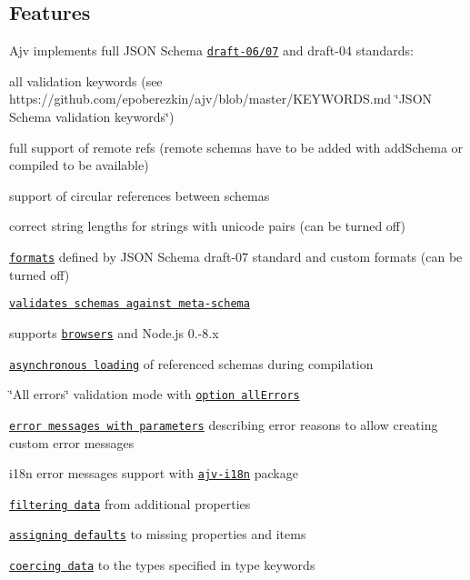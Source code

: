 \href{https://github.com/ebdrup/json-schema-benchmark/blob/master/README.md#performance}{\tt }

\subsection*{Features}


\begin{DoxyItemize}
\item Ajv implements full J\+S\+ON Schema \href{http://json-schema.org/}{\tt draft-\/06/07} and draft-\/04 standards\+:
\begin{DoxyItemize}
\item all validation keywords (see https\+://github.com/epoberezkin/ajv/blob/master/\+K\+E\+Y\+W\+O\+R\+D\+S.\+md \char`\"{}\+J\+S\+O\+N Schema validation keywords\char`\"{})
\item full support of remote refs (remote schemas have to be added with {\ttfamily add\+Schema} or compiled to be available)
\item support of circular references between schemas
\item correct string lengths for strings with unicode pairs (can be turned off)
\item \href{#formats}{\tt formats} defined by J\+S\+ON Schema draft-\/07 standard and custom formats (can be turned off)
\item \href{#api-validateschema}{\tt validates schemas against meta-\/schema}
\end{DoxyItemize}
\item supports \href{#using-in-browser}{\tt browsers} and Node.\+js 0.-\/8.\+x
\item \href{#asynchronous-schema-compilation}{\tt asynchronous loading} of referenced schemas during compilation
\item \char`\"{}\+All errors\char`\"{} validation mode with \href{#options}{\tt option all\+Errors}
\item \href{#validation-errors}{\tt error messages with parameters} describing error reasons to allow creating custom error messages
\item i18n error messages support with \href{https://github.com/epoberezkin/ajv-i18n}{\tt ajv-\/i18n} package
\item \href{#filtering-data}{\tt filtering data} from additional properties
\item \href{#assigning-defaults}{\tt assigning defaults} to missing properties and items
\item \href{#coercing-data-types}{\tt coercing data} to the types specified in {\ttfamily type} keywords

\end{DoxyItemize}
